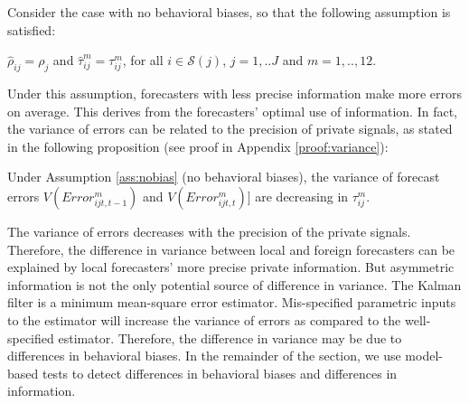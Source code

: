 Consider the case with no behavioral biases, so that the following assumption is satisfied:
\begin{assumption}\label{ass:nobias} $\hat\rho_{ij}=\rho_j$ and $\hat\tau_{ij}^m=\tau_{ij}^m$, for all $i\in\mathcal{S}(j)$, $j=1,..J$ and $m=1,..,12$.
\end{assumption}
Under this assumption, forecasters with less precise information make more errors on average. This derives from the forecasters' optimal use of information. In fact, the variance of errors can be related to the precision of private signals, as stated in the following proposition (see proof in Appendix \ref{proof:variance}):
\begin{prop}\label{prop:variance} Under Assumption \ref{ass:nobias} (no behavioral biases), the variance of forecast errors $V(Error_{ijt,t-1}^m)$ and $V(Error_{ijt,t}^m)]$ are decreasing in $\tau_{ij}^m$.
\end{prop}
The variance of errors decreases with the precision of the private signals. Therefore, the difference in variance between local and foreign forecasters can be explained by local forecasters' more precise private information. But asymmetric information is not the only potential source of difference in variance. The Kalman filter is a minimum mean-square error estimator. Mis-specified parametric inputs to the estimator will increase the variance of errors as compared to the well-specified estimator. Therefore, the difference in variance may be due to differences in behavioral biases. In the remainder of the section, we use model-based tests to detect differences in behavioral biases and differences in information. 